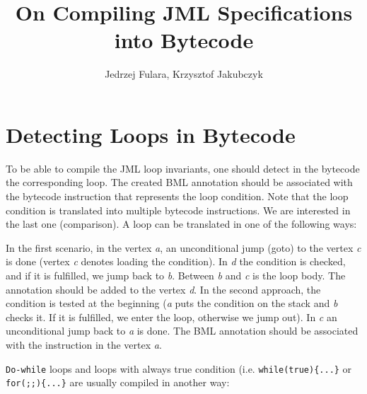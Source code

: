 \documentclass{article}
\author{Jedrzej Fulara, Krzysztof Jakubczyk}
\title{On Compiling JML Specifications into Bytecode}
\begin{document}
\maketitle
\section{Detecting Loops in Bytecode}
To be able to compile the JML loop invariants, one should detect in the bytecode the corresponding loop. The created BML annotation should be associated with the bytecode instruction that represents the loop condition. Note that the loop condition is translated into multiple bytecode instructions. We are interested in the last one (comparison). A loop can be translated in one of the following ways:
\begin{center}
\end{center}
In the first scenario, in the vertex \textit{a}, an unconditional jump (goto) to the vertex \textit{c} is done (vertex \textit{c} denotes loading the condition). In \textit{d} the condition is checked, and if it is fulfilled, we jump back to \textit{b}. Between \textit{b} and \textit{c} is the loop body. The annotation should be added to the vertex \textit{d}. In the second approach, the condition is tested at the beginning (\textit{a} puts the condition on the stack and \textit{b} checks it. If it is fulfilled, we enter the loop, otherwise we jump out). In \textit{c} an unconditional jump back to \textit{a} is done. The BML annotation should be associated with the instruction in the vertex \textit{a}.

\texttt{Do-while} loops and loops with always true condition (i.e. \texttt{while(true)\{...\}} or \texttt{for(;;)\{...\}} are usually compiled in another way:
\end{document}
